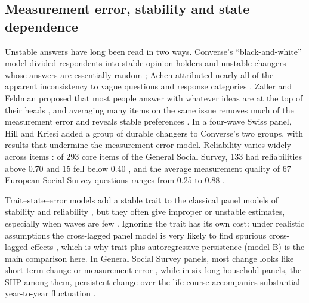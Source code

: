 \subsection{Measurement error, stability and state dependence}\label{sec:bg-measurement}

Unstable answers have long been read in two ways. Converse's ``black-and-white'' model divided respondents into stable opinion holders and unstable changers whose answers are essentially random \cite{converse1964}; Achen attributed nearly all of the apparent inconsistency to vague questions and response categories \cite{achen1975}. Zaller and Feldman proposed that most people answer with whatever ideas are at the top of their heads \cite{zaller1992}, and averaging many items on the same issue removes much of the measurement error and reveals stable preferences \cite{ansolabehere2008}. In a four-wave Swiss panel, Hill and Kriesi \cite{hill2001,hillkriesi2001} added a group of durable changers to Converse's two groups, with results that undermine the measurement-error model. Reliability varies widely across items \cite{alwin2007,alwinkrosnick1991reliability}: of 293 core items of the General Social Survey, 133 had reliabilities above 0.70 and 15 fell below 0.40 \cite{hout2016}, and the average measurement quality of 67 European Social Survey questions ranges from 0.25 to 0.88 \cite{poses2021}.

Trait--state--error models \cite{kenny1995tse} add a stable trait to the classical panel models of stability and reliability \cite{heise1969,wiley1970}, but they often give improper or unstable estimates, especially when waves are few \cite{cole2005tso,ludtke2018starts}. Ignoring the trait has its own cost: under realistic assumptions the cross-lagged panel model is very likely to find spurious cross-lagged effects \cite{lucas2023,hamaker2015critique}, which is why trait-plus-autoregressive persistence (model B) is the main comparison here. In General Social Survey panels, most change looks like short-term change or measurement error \cite{kiley2020,vaiseykiley2021}, while in six long household panels, the SHP among them, persistent change over the life course accompanies substantial year-to-year fluctuation \cite{lersch2023}.

